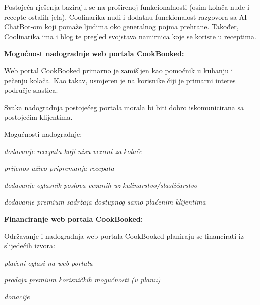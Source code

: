 		\bigskip
		\bigskip
		\bigskip

		Postojeća rješenja baziraju se na proširenoj funkcionalnosti (osim kolača nude i recepte ostalih jela).
		Coolinarika nudi i dodatnu funckionalost razgovora sa AI ChatBot-om koji pomaže ljudima oko generalnog
		pojma prehrane. Također, Coolinarika ima i blog te pregled svojstava namirnica koje se koriste u receptima.

		\bigskip

		\textbf{Mogućnost nadogradnje web portala CookBooked:}

		Web portal CookBooked primarno je zamišljen kao pomoćnik u kuhanju i pečenju kolača.
		Kao takav, usmjeren je na korisnike čiji je primarni interes područje slastica.

		\smallskip

		Svaka nadogradnja postojećeg portala morala bi biti dobro iskomunicirana sa postojećim klijentima.

		\smallskip

		Mogućnosti nadogradnje:
		
		\begin{packed_item}
			\item \textit{dodavanje recepata koji nisu vezani za kolače}
			\item \textit{prijenos uživo pripremanja recepata}
			\item \textit{dodavanje oglasnik poslova vezanih uz kulinarstvo/slastičarstvo}
			\item \textit{dodavanje premium sadržaja dostupnog samo plaćenim klijentima}
		\end{packed_item}

		\textbf{Financiranje web portala CookBooked:}

		Održavanje i nadogradnja web portala CookBooked planiraju se financirati iz slijedećih izvora:

		\begin{packed_item}
			\item \textit{plaćeni oglasi na web portalu}
			\item \textit{prodaja premium korisničkih mogućnosti (u planu)}
			\item \textit{donacije}
		\end{packed_item}




		\eject
		
	